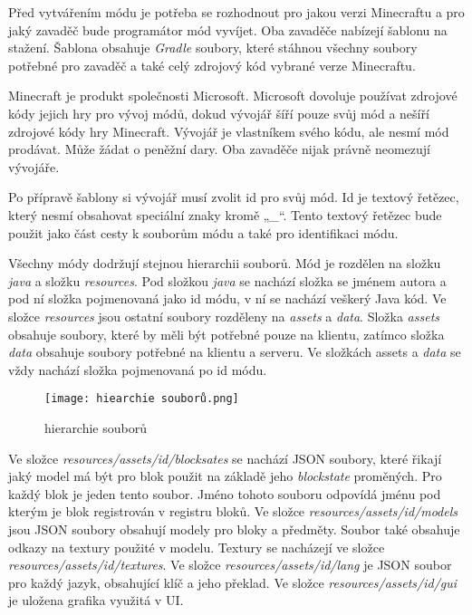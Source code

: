 \documentclass[FM,RP]{tulthesis}
\begin{document}
\par    Před vytvářením módu je potřeba se rozhodnout pro jakou verzi Minecraftu a pro jaký zavaděč bude programátor mód vyvíjet. Oba zavaděče nabízejí šablonu na stažení. Šablona obsahuje \textit{Gradle} soubory, které stáhnou všechny soubory potřebné pro zavaděč a také celý zdrojový kód vybrané verze Minecraftu. 
\par    Minecraft je produkt společnosti Microsoft. Microsoft dovoluje používat zdrojové kódy jejich hry pro vývoj módů, dokud vývojář šíří pouze svůj mód a nešíří zdrojové kódy hry Minecraft. Vývojář je vlastníkem svého kódu, ale nesmí mód prodávat. Může žádat o peněžní dary. Oba zavaděče nijak právně neomezují  vývojáře.
\par    Po přípravě šablony si vývojář musí zvolit id pro svůj mód. Id je textový řetězec, který nesmí obsahovat speciální znaky kromě „\textit{\_}“.  Tento textový řetězec bude použit jako část cesty k souborům módu a také pro identifikaci módu. 
\par    Všechny módy dodržují stejnou hierarchii souborů. Mód je rozdělen na složku \textit{java} a složku \textit{resources}.  Pod složkou \textit{java} se nachází složka se jménem autora a pod ní složka pojmenovaná jako id módu, v ní se nachází veškerý Java kód. Ve složce \textit{resources} jsou ostatní soubory rozděleny na \textit{assets} a \textit{data}. Složka \textit{assets} obsahuje soubory, které by měli být potřebné pouze na klientu, zatímco složka \textit{data} obsahuje soubory potřebné na klientu a serveru. Ve složkách assets a \textit{data} se vždy nachází složka pojmenovaná po id módu.
\begin{figure}
    \centering
    \texttt{[image: hiearchie souborů.png]}
    \caption{hierarchie souborů}
    \label{fig:enter-label}
\end{figure}
\par    Ve složce \textit{resources/assets/id/blocksates} se nachází JSON soubory, které řikají jaký model má být pro blok použit na základě jeho \textit{blockstate} proměných. Pro každý blok je jeden tento soubor. Jméno tohoto souboru odpovídá jménu pod kterým je blok registrován v registru bloků. Ve složce  \textit{resources/assets/id/models} jsou JSON soubory  obsahují modely pro bloky a předměty. Soubor také obsahuje odkazy na textury použité v modelu. Textury se nacházejí ve složce \textit{resources/assets/id/textures}. Ve složce \textit{resources/assets/id/lang} je JSON soubor pro každý jazyk, obsahující klíč a jeho překlad. Ve  složce \textit{resources/assets/id/gui} je uložena grafika využitá v UI.
\end{document}
